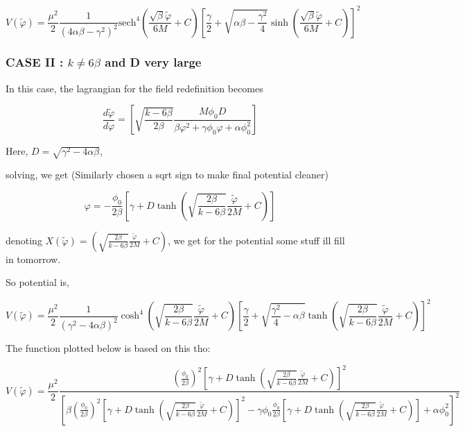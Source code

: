 \documentclass{article}
\begin{document}
\begin{equation}
    V(\tilde{\varphi}) = \frac{\mu^2}{2} \frac{1}{(4\alpha\beta-\gamma^2)^2} \text{sech}^4\left(\frac{\sqrt{\beta}\tilde{\varphi}}{6M}+C \right) \left[\frac{\gamma }{2} + \sqrt{\alpha\beta-\frac{\gamma^2}{4}} \sinh\left(\frac{\sqrt{\beta}\tilde{\varphi}}{6M}+C \right) \right]^2
\end{equation}

\subsubsection{CASE II : $k \neq 6\beta$ and D very large}

In this case, the lagrangian for the field redefinition becomes

\begin{equation}
    \frac{d\tilde{\varphi}}{d\varphi} = \left[ \sqrt{\frac{k-6\beta}{2\beta}} \frac{M \phi_0 D}{\beta \varphi^2  +\gamma \phi_0 \varphi +\alpha \phi^2_0} \right]
\end{equation}

Here,  $D = \sqrt{ \gamma^2-4\alpha \beta}$, 

solving, we get (Similarly chosen a sqrt sign to make final potential cleaner)

\begin{equation}
    \varphi = -\frac{\phi_0}{2 \beta} \left[ \gamma + D\tanh \left( \sqrt{\frac{2\beta}{k-6\beta}} \frac{\tilde{\varphi}}{2M} + C \right) \right]
\end{equation}

denoting $X(\tilde{\varphi}) = \left( \sqrt{\frac{2\beta}{k-6\beta}} \frac{\tilde{\varphi}}{2M} + C \right)$, we get for the potential some stuff ill fill in tomorrow.


So potential is, 


\begin{equation}
    V(\tilde{\varphi}) = \frac{\mu^2}{2} \frac{1}{(\gamma^2-4\alpha\beta)^2} \cosh^4\left( \sqrt{\frac{2\beta}{k-6\beta}} \frac{\tilde{\varphi}}{2M} + C \right)  \left[\frac{\gamma }{2} + \sqrt{\frac{\gamma^2}{4}-\alpha\beta} \tanh\left( \sqrt{\frac{2\beta}{k-6\beta}} \frac{\tilde{\varphi}}{2M} + C \right)  \right]^2
\end{equation}

The function plotted below is based on this tho:

\begin{equation}
    V(\tilde{\varphi}) = \frac{\mu^2}{2} \frac{(\frac{\phi_0}{2\beta})^2\left[ \gamma + D\tanh \left( \sqrt{\frac{2\beta}{k-6\beta}} \frac{\tilde{\varphi}}{2M} + C \right) \right]^2}{\left[\beta (\frac{\phi_0}{2 \beta})^2 \left[ \gamma + D\tanh \left( \sqrt{\frac{2\beta}{k-6\beta}} \frac{\tilde{\varphi}}{2M} + C \right) \right]^2 - \gamma \phi_0 \frac{\phi_0}{2 \beta} \left[ \gamma + D\tanh \left( \sqrt{\frac{2\beta}{k-6\beta}} \frac{\tilde{\varphi}}{2M} + C \right) \right] + \alpha \phi_0^2 \right]^2}
\end{equation}
\end{document}
